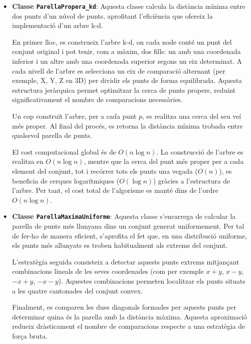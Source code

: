 \documentclass{ieeetj}
\begin{document}
\begin{itemize}
\item \textbf{Classe \texttt{ParellaPropera\_kd}}: 
Aquesta classe calcula la distància mínima entre dos punts d’un núvol de punts, aprofitant l’eficiència que ofereix la implementació d’un arbre k-d.

En primer lloc, es construeix l’arbre k-d, on cada node conté un punt del conjunt original i pot tenir, com a màxim, dos fills: un amb una coordenada inferior i un altre amb una coordenada superior segons un eix determinat. A cada nivell de l’arbre es selecciona un eix de comparació alternant (per exemple, X, Y, Z en 3D) per dividir els punts de forma equilibrada. Aquesta estructura jeràrquica permet optimitzar la cerca de punts propers, reduint significativament el nombre de comparacions necessàries.

Un cop construït l’arbre, per a cada punt \( p \), es realitza una cerca del seu veí més proper. Al final del procés, es retorna la distància mínima trobada entre qualsevol parella de punts.

El cost computacional global és de \( O(n \log n) \). La construcció de l’arbre es realitza en \( O(n \log n) \), mentre que la cerca del punt més proper per a cada element del conjunt, tot i recórrer tots els punts una vegada (\( O(n) \)), es beneficia de cerques logarítmiques (\( O(\log n) \)) gràcies a l’estructura de l’arbre. Per tant, el cost total de l’algorisme es manté dins de l’ordre \( O(n \log n) \).

\end{itemize}

\begin{itemize}
\item \textbf{Classe \texttt{ParellaMaximaUniforme}}: Aquesta classe s'encarrega de calcular la parella de punts més llunyana dins un conjunt generat uniformement. Per tal de fer-ho de manera eficient, s'aprofita el fet que, en una distribució uniforme, els punts més allunyats es troben habitualment als extrems del conjunt. 

L'estratègia seguida consisteix a detectar aquests punts extrems mitjançant combinacions lineals de les seves coordenades (com per exemple $x + y$, $x - y$, $-x + y$, $-x - y$). Aquestes combinacions permeten localitzar els punts situats a les quatre cantonades del conjunt convex. 

Finalment, es comparen les dues diagonals formades per aquests punts per determinar quina és la parella amb la distància màxima. Aquesta aproximació redueix dràsticament el nombre de comparacions respecte a una estratègia de força bruta.
\end{itemize}
\end{document}
